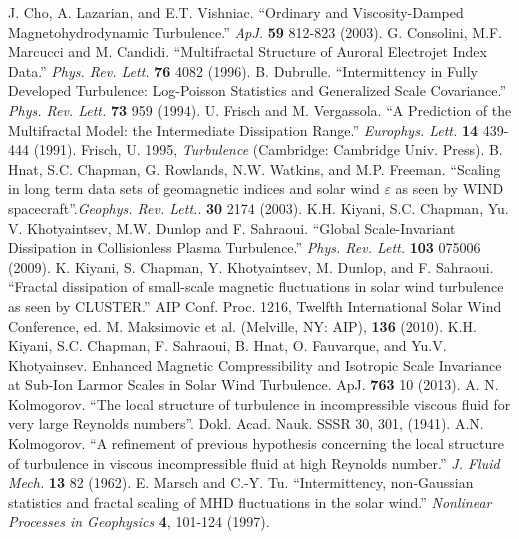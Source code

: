\documentclass[preprint2]{aastex}
\begin{document}
\begin{thebibliography}{}
 J. Cho, A. Lazarian, and E.T. Vishniac. ``Ordinary and Viscosity-Damped Magnetohydrodynamic Turbulence.'' {\it ApJ.} {\bf 59} 812-823 (2003).
 G. Consolini, M.F. Marcucci and M. Candidi. ``Multifractal Structure of Auroral Electrojet Index Data.'' {\it Phys. Rev. Lett.} {\bf 76} 4082 (1996).
 B. Dubrulle. ``Intermittency in Fully Developed Turbulence: Log-Poisson Statistics and Generalized Scale Covariance.'' {\it Phys. Rev. Lett.} {\bf 73} 959 (1994).
 U. Frisch and M. Vergassola. ``A Prediction of the Multifractal Model: the Intermediate Dissipation Range.'' {\it Europhys. Lett.} {\bf 14} 439-444 (1991).
 Frisch, U. 1995, {\it Turbulence} (Cambridge: Cambridge Univ. Press).
 B. Hnat, S.C. Chapman, G. Rowlands, N.W. Watkins, and M.P. Freeman. ``Scaling in long term data sets of geomagnetic indices and solar wind $\varepsilon$ as seen by WIND spacecraft''.{\it Geophys. Rev. Lett.}. {\bf 30} 2174 (2003).
 K.H. Kiyani, S.C. Chapman, Yu. V. Khotyaintsev, M.W. Dunlop and F. Sahraoui. ``Global Scale-Invariant Dissipation in Collisionless Plasma Turbulence.'' {\it Phys. Rev. Lett.} {\bf 103} 075006 (2009). 
 K. Kiyani, S. Chapman, Y. Khotyaintsev, M. Dunlop, and F. Sahraoui. ``Fractal dissipation of small-scale magnetic fluctuations in solar wind turbulence as seen by CLUSTER.'' AIP Conf. Proc. 1216, Twelfth International Solar Wind Conference, ed. M. Maksimovic et al. (Melville, NY: AIP), {\bf 136} (2010).
 K.H. Kiyani, S.C. Chapman, F. Sahraoui, B. Hnat, O. Fauvarque, and Yu.V. Khotyainsev. Enhanced Magnetic Compressibility and Isotropic Scale Invariance at Sub-Ion Larmor Scales in Solar Wind Turbulence. ApJ. {\bf 763} 10 (2013).
 A. N. Kolmogorov. ``The local structure of turbulence in incompressible viscous fluid for very large Reynolds numbers''. Dokl. Acad. Nauk. SSSR 30, 301, (1941).
 A.N. Kolmogorov. ``A refinement of previous hypothesis concerning the local structure of turbulence in viscous incompressible fluid at high Reynolds number.'' {\it J. Fluid Mech.} {\bf 13} 82 (1962).
 E. Marsch and C.-Y. Tu. ``Intermittency, non-Gaussian statistics and fractal scaling of MHD fluctuations in the solar wind.'' {\it Nonlinear Processes in Geophysics} {\bf 4}, 101-124 (1997).

\end{thebibliography}
\end{document}
